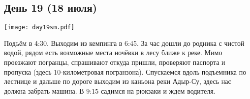 \graphicspath{{Pictures/Chapter5/Day19}}



\subsection{День 19 (18 июля)}\label{subsec:Day19}
    \parbox[c]{\textwidth}{%
        \texttt{[image: day19sm.pdf]}\label{fig:Day19_map}%
    }
    \vspace{0.8cm}

Подъём в 4:30. Выходим из кемпинга в 6:45. За час дошли до родника с чистой водой, рядом есть возможные места ночёвки в лесу ближе к реке. Мимо проезжают погранцы, спрашивают откуда пришли, проверяют паспорта и пропуска (здесь 10-километровая погранзона). Спускаемся вдоль подъемника по лестнице и дальше по дороге выходим из каньона реки Адыр-Су, здесь нас должна забрать машина. В 9:15 садимся на рюкзаки и ждем водителя.








    \FloatBarrier
